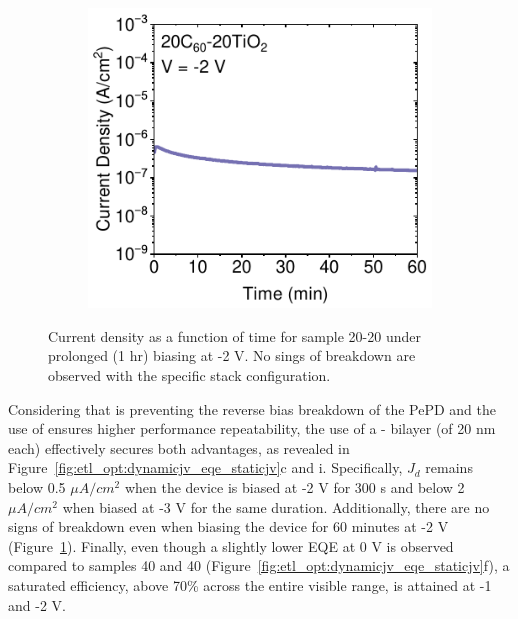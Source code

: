 \begin{figure}[htbp]
    \centering
    \begin{subfigure}[t]{0.5\textwidth}
        \centering
        \includegraphics[width=\textwidth]{chapters/transport_layers/images/JV_1hr_20_20.pdf} %
                
    \end{subfigure}

    \caption[Current density as a function of time for sample 20-20 under prolonged (1 hr) biasing at -2 V.]{Current density as a function of time for sample 20-20 under prolonged (1 hr) biasing at -2 V. No sings of breakdown are observed with the specific stack configuration.}
    \label{fig:et_optim:1hr_stability}
\end{figure}



Considering that  is preventing the reverse bias breakdown of the PePD and the use of  ensures higher performance repeatability, the use of a - bilayer (of 20 nm each) effectively secures both advantages, as revealed in Figure~\ref{fig:etl_opt:dynamicjv_eqe_staticjv}c and i. Specifically, $J_d$ remains below 0.5 $\mu A/cm^2$ when the device is biased at -2 V for 300 s and below 2 $\mu A/cm^2$ when biased at -3 V for the same duration. Additionally, there are no signs of breakdown even when biasing the device for 60 minutes at -2 V (Figure~\ref{fig:et_optim:1hr_stability}). Finally, even though a slightly lower EQE at 0 V is observed compared to samples 40 and 40 (Figure~\ref{fig:etl_opt:dynamicjv_eqe_staticjv}f), a saturated efficiency, above 70\% across the entire visible range, is attained at -1 and -2 V. 

